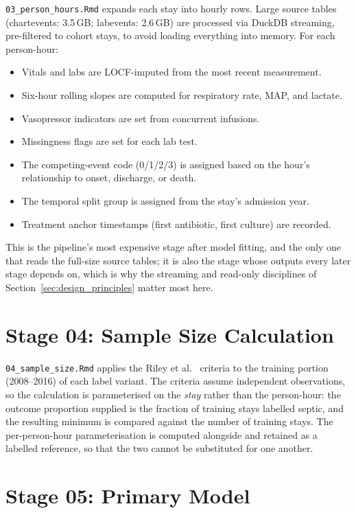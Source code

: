 \texttt{03\_person\_hours.Rmd} expands each stay into hourly rows. Large source
tables (chartevents: 3.5\,GB; labevents: 2.6\,GB) are processed via DuckDB
streaming, pre-filtered to cohort stays, to avoid loading everything into
memory. For each person-hour:

\begin{itemize}
    \item Vitals and labs are LOCF-imputed from the most recent measurement.
    \item Six-hour rolling slopes are computed for respiratory rate, MAP, and
    lactate.
    \item Vasopressor indicators are set from concurrent infusions.
    \item Missingness flags are set for each lab test.
    \item The competing-event code (0/1/2/3) is assigned based on the hour's
    relationship to onset, discharge, or death.
    \item The temporal split group is assigned from the stay's admission year.
    \item Treatment anchor timestamps (first antibiotic, first culture) are
    recorded.
\end{itemize}

This is the pipeline's most expensive stage after model fitting, and the only
one that reads the full-size source tables; it is also the stage whose outputs
every later stage depends on, which is why the streaming and read-only
disciplines of Section~\ref{sec:design_principles} matter most here.


\section{Stage 04: Sample Size Calculation}

\texttt{04\_sample\_size.Rmd} applies the Riley et al.\
\cite{riley2019sample} criteria to the training portion (2008--2016) of each
label variant. The criteria assume independent observations, so the calculation
is parameterised on the \emph{stay} rather than the person-hour: the outcome
proportion supplied is the fraction of training stays labelled septic, and the
resulting minimum is compared against the number of training stays. The
per-person-hour parameterisation is computed alongside and retained as a
labelled reference, so that the two cannot be substituted for one another.


\section{Stage 05: Primary Model}

